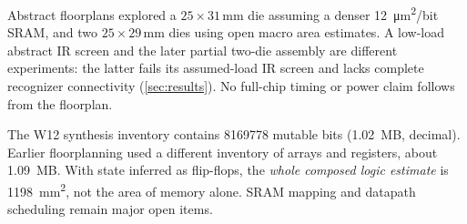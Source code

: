 Abstract floorplans explored a $25\times31$\,mm die assuming a denser \SI{12}{\micro m^2}/bit SRAM, and two $25\times29$\,mm dies using open macro area estimates. A low-load abstract IR screen and the later partial two-die assembly are different experiments: the latter fails its assumed-load IR screen and lacks complete recognizer connectivity (\cref{sec:results}). No full-chip timing or power claim follows from the floorplan.

The W12 synthesis inventory contains \num{8169778} mutable bits (\SI{1.02}{MB}, decimal). Earlier floorplanning used a different inventory of arrays and registers, about \SI{1.09}{MB}. With state inferred as flip-flops, the \emph{whole composed logic estimate} is \SI{1198}{mm^2}, not the area of memory alone. SRAM mapping and datapath scheduling remain major open items.
